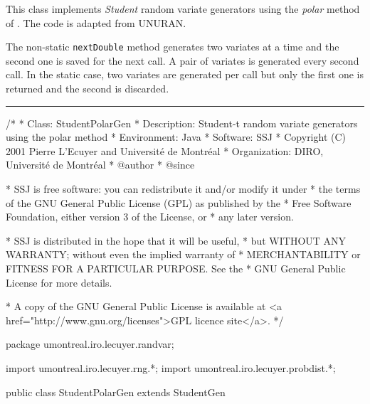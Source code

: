 
This class implements {\em Student\/} random variate generators using
 the {\em polar\/} method of \cite{rBAI94a}.
The code is adapted from UNURAN.

The non-static \texttt{nextDouble} method generates two variates at a time
and the second one is saved for the next call.  
A pair of variates is generated every second call. 
In the static case, two variates are generated per
call but only the first one is returned and the second is discarded.

\bigskip\hrule

\begin{code}
\begin{hide}
/*
 * Class:        StudentPolarGen
 * Description:  Student-t random variate generators using the polar method
 * Environment:  Java
 * Software:     SSJ 
 * Copyright (C) 2001  Pierre L'Ecuyer and Université de Montréal
 * Organization: DIRO, Université de Montréal
 * @author       
 * @since

 * SSJ is free software: you can redistribute it and/or modify it under
 * the terms of the GNU General Public License (GPL) as published by the
 * Free Software Foundation, either version 3 of the License, or
 * any later version.

 * SSJ is distributed in the hope that it will be useful,
 * but WITHOUT ANY WARRANTY; without even the implied warranty of
 * MERCHANTABILITY or FITNESS FOR A PARTICULAR PURPOSE.  See the
 * GNU General Public License for more details.

 * A copy of the GNU General Public License is available at
   <a href="http://www.gnu.org/licenses">GPL licence site</a>.
 */
\end{hide}
package umontreal.iro.lecuyer.randvar;\begin{hide}
import umontreal.iro.lecuyer.rng.*;
import umontreal.iro.lecuyer.probdist.*;
\end{hide}

public class StudentPolarGen extends StudentGen \begin{hide} {

    private boolean available = false;
    private double[] variates = new double[2];
    private static double[] staticVariates = new double[2];
    // Used by the polar method.
\end{hide}\end{code}

